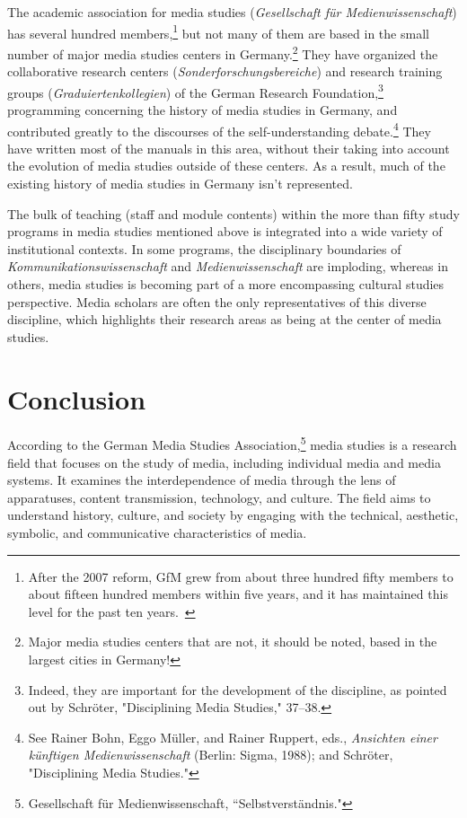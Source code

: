 \documentclass{tufte-handout}
\begin{document}
The academic association for media studies (\emph{Gesellschaft für
Medienwissenschaft}) has several hundred members,\footnote{After the
  2007 reform, GfM grew from about three hundred fifty members to about
  fifteen hundred members within five years, and it has maintained this
  level for the past ten years.~} but not many of them are based in the
small number of major media studies centers in Germany.\footnote{Major
  media studies centers that are not, it should be noted, based in the
  largest cities in Germany!} They have organized the collaborative
research centers (\emph{Sonderforschungsbereiche}) and research training
groups (\emph{Graduiertenkollegien}) of the German Research
Foundation,\footnote{Indeed, they are important for the development of
  the discipline, as pointed out by Schröter, "Disciplining Media
  Studies," 37--38.} programming concerning the history of media studies
in Germany, and contributed greatly to the discourses of the
self-understanding debate.\footnote{See Rainer Bohn, Eggo Müller, and
  Rainer Ruppert, eds., \emph{Ansichten einer künftigen
  Medienwissenschaft} (Berlin: Sigma, 1988); and Schröter, "Disciplining
  Media Studies."} They have written most of the manuals in this area,
without their taking into account the evolution of media studies outside
of these centers. As a result, much of the existing history of media
studies in Germany isn't represented.

The bulk of teaching (staff and module contents) within the more than
fifty study programs in media studies mentioned above is integrated into
a wide variety of institutional contexts. In some programs, the
disciplinary boundaries of \emph{Kommunikationswissenschaft} and
\emph{Medienwissenschaft} are imploding, whereas in others, media
studies is becoming part of a more encompassing cultural studies
perspective. Media scholars are often the only representatives of this
diverse discipline, which highlights their research areas as being at
the center of media studies.

\hypertarget{conclusion}{%
\section{Conclusion}\label{conclusion}}

According to the German Media Studies Association,\footnote{Gesellschaft
  für Medienwissenschaft, ``Selbstverständnis."} media studies is a
research field that focuses on the study of media, including individual
media and media systems. It examines the interdependence of media
through the lens of apparatuses, content transmission, technology, and
culture. The field aims to understand history, culture, and society by
engaging with the technical, aesthetic, symbolic, and communicative
characteristics of media.
\end{document}
